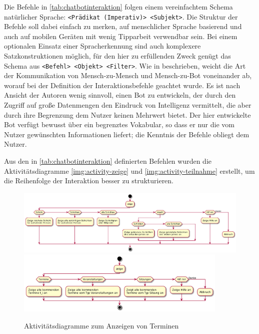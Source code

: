 Die Befehle in \autoref{tab:chatbotinteraktion} folgen einem vereinfachtem Schema natürlicher Sprache: \texttt{<Prädikat (Imperativ)> <Subjekt>}. Die Struktur der Befehle soll dabei einfach zu merken, auf menschlicher Sprache basierend und auch auf mobilen Geräten mit wenig Tipparbeit verwendbar sein. Bei einem optionalen Einsatz einer Spracherkennung sind auch komplexere Satzkonstruktionen möglich, für den hier zu erfüllenden Zweck genügt das Schema aus \texttt{<Befehl> <Objekt> <Filter>}. Wie in \cite{ZueConversationalinterfacesadvances2000} beschrieben, weicht die Art der Kommunikation von Mensch-zu-Mensch und Mensch-zu-Bot voneinander ab, worauf bei der Definition der Interaktionsbefehle geachtet wurde. Es ist nach Ansicht der Autoren wenig sinnvoll, einen Bot zu entwickeln, der durch den Zugriff auf große Datenmengen den Eindruck von Intelligenz vermittelt, die aber durch ihre Begrenzung dem Nutzer keinen Mehrwert bietet. Der hier entwickelte Bot verfügt bewusst über ein begrenztes Vokabular, so dass er nur die vom Nutzer gewünschten Informationen liefert; die Kenntnis der Befehle obliegt dem Nutzer.

Aus den in \autoref{tab:chatbotinteraktion} definierten Befehlen wurden die Aktivitätsdiagramme \autoref{img:activity-zeige} und \autoref{img:activity-teilnahme} erstellt, um die Reihenfolge der Interaktion besser zu strukturieren.

\begin{figure}[htbp]
    \centering
    \includegraphics[width=\textwidth]{../docs/uml/activity-zeige.png}
    \includegraphics[width=0.9\textwidth]{../docs/uml/activity-zeige2.png}
    \caption{Aktivitätsdiagramme zum Anzeigen von Terminen}
    \label{img:activity-zeige}
\end{figure}

